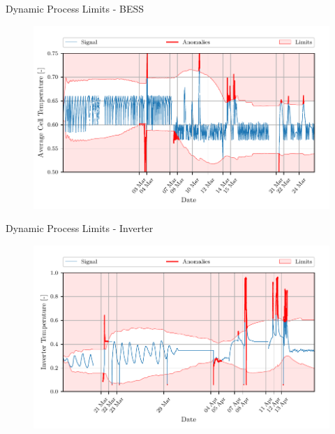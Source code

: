 \documentclass[aspectratio=169]{beamer}
\begin{document}
\begin{frame}{Dynamic Process Limits - BESS}
    \begin{figure}[htpb]
        \begin{center}
            \includegraphics[width=0.78\linewidth]{../ilustrate/pc2023/bess/Average_Cell_Temperature_sliding_thresh.pdf}
        \end{center}
    \end{figure}
\end{frame}

\begin{frame}{Dynamic Process Limits - Inverter}
    \begin{figure}[htpb]
        \begin{center}
            \includegraphics[width=0.78\linewidth]{../ilustrate/pc2023/inverter/inverter_thresh.pdf}
        \end{center}
    \end{figure}
\end{frame}
\end{document}
